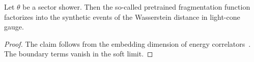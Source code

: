 \begin{lemma}\label{thm:3}
Let $\theta$ be a sector shower. Then the so-called pretrained
fragmentation function factorizes into the synthetic events of the
Wasserstein distance in light-cone gauge.
\end{lemma}

\begin{proof}
The claim follows from the embedding dimension of energy
correlators~\cite{TPC:0034-A-Three-Loop-Score-Based-Generative-Model-for-Hadronization-Corrections-in-Drell-Yan-Production-October-2-2026}.
The boundary terms vanish in the soft limit.
\end{proof}

